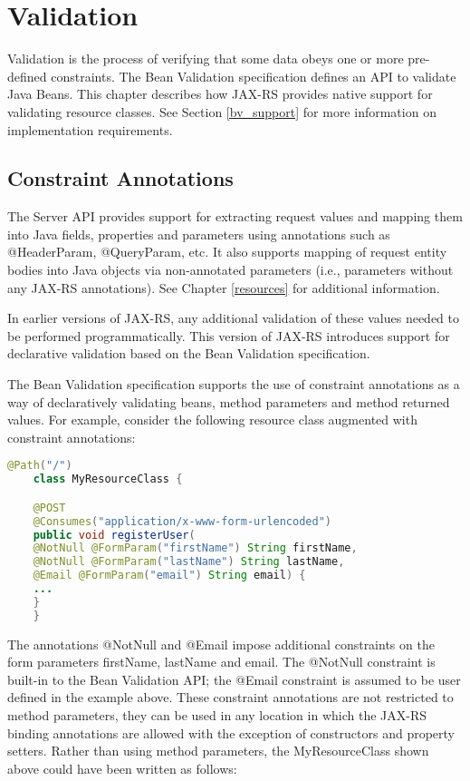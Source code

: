 \chapter{Validation}
\label{validation}

Validation is the process of verifying that some data obeys one or more pre-defined constraints. The Bean Validation
specification defines an API to validate Java Beans. This chapter describes how JAX-RS provides native support for
validating resource classes. See Section \ref{bv_support} for more information on implementation requirements.

\section{Constraint Annotations}
\label{constraint_annotations}

The Server API provides support for extracting request values and mapping them into Java fields, properties and
parameters using annotations such as @HeaderParam, @QueryParam, etc. It also supports mapping of
request entity bodies into Java objects via non-annotated parameters (i.e., parameters without any JAX-RS annotations).
See Chapter \ref{resources} for additional information.

In earlier versions of JAX-RS, any additional validation of these values needed to be performed programmatically. This
version of JAX-RS introduces support for declarative validation based on the Bean Validation specification.

The Bean Validation specification supports the use of constraint annotations as a way of declaratively validating beans,
method parameters and method returned values. For example, consider the following resource class augmented with
constraint annotations:

\begin{lstlisting}[language=Java]
    @Path("/")
    class MyResourceClass {

    @POST
    @Consumes("application/x-www-form-urlencoded")
    public void registerUser(
    @NotNull @FormParam("firstName") String firstName,
    @NotNull @FormParam("lastName") String lastName,
    @Email @FormParam("email") String email) {
    ...
    }
    }
\end{lstlisting}

The annotations @NotNull and @Email impose additional constraints on the form parameters
firstName, lastName and email. The @NotNull constraint is built-in to
the Bean Validation API; the @Email constraint is assumed to be user defined in the example above.
These constraint annotations are not restricted to method parameters, they can be used in any location in which the
JAX-RS binding annotations are allowed with the exception of constructors and property setters. Rather than using method
parameters, the MyResourceClass shown above could have been written as follows:

